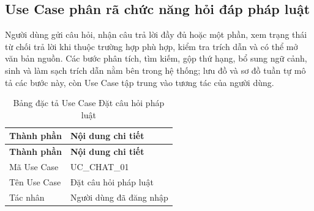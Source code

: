\documentclass[12pt,a4paper,oneside]{report}
\begin{document}
\subsection{Use Case phân rã chức năng hỏi đáp pháp luật}
Người dùng gửi câu hỏi, nhận câu trả lời đầy đủ hoặc một phần, xem trạng thái từ chối trả lời khi thuộc trường hợp phù hợp, kiểm tra trích dẫn và có thể mở văn bản nguồn. Các bước phân tích, tìm kiếm, gộp thứ hạng, bổ sung ngữ cảnh, sinh và làm sạch trích dẫn nằm bên trong hệ thống; lưu đồ và sơ đồ tuần tự mô tả các bước này, còn Use Case tập trung vào tương tác của người dùng.
{
  \begin{longtable}{|L{3.6cm}|L{11.2cm}|}
    \caption{Bảng đặc tả Use Case Đặt câu hỏi pháp luật}\label{tab:uc-chat-ask}                                                                                                                                                                     \\
    \hline
    \textbf{Thành phần} & \textbf{Nội dung chi tiết}                                                                                                                                                                                                  \\
    \hline
    \endfirsthead
    \hline
    \textbf{Thành phần} & \textbf{Nội dung chi tiết}                                                                                                                                                                                                  \\
    \hline
    \endhead
    Mã Use Case       & UC\_CHAT\_01                                                                                                                                                                                                                \\
    \hline
    Tên Use Case      & Đặt câu hỏi pháp luật                                                                                                                                                                                                       \\
    \hline
    Tác nhân            & Người dùng đã đăng nhập                                                                                                                                                                                                     \\

\end{longtable}}
\end{document}
